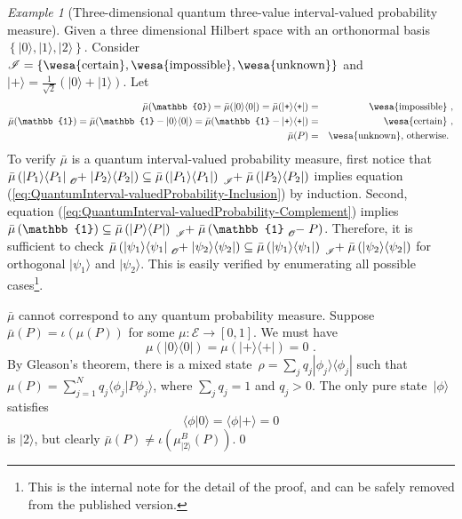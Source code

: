 \documentclass{article}
\theoremstyle{remark}
\newtheorem{example}{Example}
\newcommand{\events}{\ensuremath{\mathcal{E}}}
\newcommand{\ket}[1]{|#1\rangle}
\newcommand{\ip}[2]{\langle #1 | #2 \rangle}
\newcommand{\proj}[1]{|#1 \rangle\langle #1 |}
\newcommand{\ps}{\texttt{+}}
\newcommand{\imposs}{{\mbox{\wesa{impossible}}}}
\newcommand{\necess}{{\mbox{\wesa{certain}}}}
\newcommand{\unknown}{{\mbox{\wesa{unknown}}}}
\begin{document}
\begin{example}[Three-dimensional quantum three-value interval-valued
probability measure]\label{ex:three-dimensional-three-value} Given
a three dimensional Hilbert space with an orthonormal basis $\left\{ \ket{0},\ket{1},\ket{2}\right\} $.
Consider\emph{ $\mathscr{I}=\left\{ \necess,\imposs,\unknown\right\} $}
and $\ket{\ps}=\frac{1}{\sqrt{2}}(\ket{0}+\ket{1})$. Let 
\begin{eqnarray*}
\bar{\mu}(\mathbb{0})=\bar{\mu}(\proj{0})=\bar{\mu}(\proj{\ps}) & = & \imposs\textrm{ ,}\\
\bar{\mu}(\mathbb{1})=\bar{\mu}(\mathbb{1}-\proj{0})=\bar{\mu}(\mathbb{1}-\proj{\ps}) & = & \necess\textrm{ ,}\\
\bar{\mu}(P) & = & \unknown\textrm{, otherwise. }
\end{eqnarray*}
To verify $\bar{\mu}$ is a quantum interval-valued probability measure,
first notice that $\bar{\mu}\left(\proj{P_{1}}\tensor*[_{\mathscr{O}}]{+}{}\proj{P_{2}}\right)\subseteq\bar{\mu}\left(\proj{P_{1}}\right)\tensor*[_{\mathscr{I}}]{+}{}\bar{\mu}\left(\proj{P_{2}}\right)$
implies equation (\ref{eq:QuantumInterval-valuedProbability-Inclusion})
by induction. Second, equation (\ref{eq:QuantumInterval-valuedProbability-Complement})
implies $\bar{\mu}\left(\mathbb{1}\right)\subseteq\bar{\mu}\left(\proj{P}\right)\tensor*[_{\mathscr{I}}]{+}{}\bar{\mu}\left(\mathbb{1}\tensor*[_{\mathscr{O}}]{-}{}P\right)$.
Therefore, it is sufficient to check $\bar{\mu}\left(\proj{\psi_{1}}\tensor*[_{\mathscr{O}}]{+}{}\proj{\psi_{2}}\right)\subseteq\bar{\mu}\left(\proj{\psi_{1}}\right)\tensor*[_{\mathscr{I}}]{+}{}\bar{\mu}\left(\proj{\psi_{2}}\right)$
for orthogonal $\ket{\psi_{1}}$ and $\ket{\psi_{2}}$. This is easily
verified by enumerating all possible cases\footnote{This is the internal note for the detail of the proof, and can be
safely removed from the published version.}.

$\bar{\mu}$ cannot correspond to any quantum probability measure.
Suppose $\bar{\mu}(P)=\iota\left(\mu(P)\right)$ for some $\mu:\events\rightarrow\left[0,1\right]$.
We must have 
\begin{equation}
\mu(\proj{0})=\mu(\proj{\ps})=0\textrm{ .}\label{eq:probability-zero-on-states}
\end{equation}
By Gleason's theorem, there is a mixed state~$\rho=\sum_{j}q_{j}\proj{\phi_{j}}$
such that $\mu\left(P\right)=\sum_{j=1}^{N}q_{j}\ip{\phi_{j}}{P\phi_{j}}$,
where $\sum_{j}q_{j}=1$ and $q_{j}>0$. The only pure state~$\ket{\phi}$
satisfies
\[
\ip{\phi}{0}=\ip{\phi}{\ps}=0
\]
is $\ket{2}$, but clearly $\bar{\mu}(P)\ne\iota\left(\mu_{\ket{2}}^{B}(P)\right)$.\qed\end{example}
\end{document}
